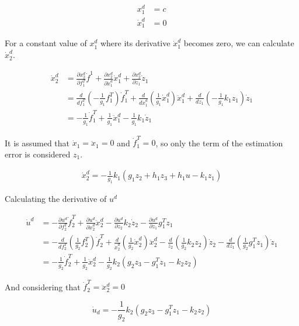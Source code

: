 \begin{align}
    x_1^d &= c \\ \nonumber
    \dot x_1^d &= 0 \nonumber
\end{align}

For a constant value of  $x_1^d$ where its derivative $\dot x_1^d$ becomes zero, we can calculate $\dot x_2^d$. 

\begin{align}
    \dot x_2^d &= \frac{\partial x_2^d}{\partial f_1^T} \dot f^1 + \frac{ \partial x_2^d}{\partial \ddot x_1^d} \dot x_1^d + \frac{\partial x_2^d}{\partial z_1} \dot z_1 \nonumber \\
    &= \frac{d}{d f_1^T} (-\frac{1}{g_1} f_1^T) \dot f_1^T + \frac{d}{d \dot x_1^d} ( \frac{1}{g_1} \dot x_1^d) \ddot x_1^d + \frac{d}{d z_1} (-\frac{1}{g_1} k_1 z_1) \dot z_1 \nonumber \\
    &= -\frac{1}{g_1} \dot f_1^T + \frac{1}{g_1} \ddot x_1^d - \frac{1}{g_1} k_1 \dot z_1
\end{align}

It is assumed that $\dot x_1 = \ddot x_1 = 0$ and $\dot f_1^T = 0$, so only the term of the estimation error is considered $z_1$.

\begin{gather}
\label{derivada control 1}
    \dot x_2^d = -\frac{1}{g_1} k_1 (g_1 z_2 + h_1 z_3 + h_1 u - k_1 z_1) 
\end{gather}

Calculating the derivative of $u^d$

\begin{align}
    \dot u^d &= - \frac{\partial u^d}{\partial{f_2^T}}  \dot f_2^T + \frac{\partial u^d}{\partial{\dot x_2^d}} \ddot x_2^d - \frac{\partial u^d}{\partial{z_2}} k_2 \dot z_2 - \frac{\partial u^d}{\partial{z_1}} g_1^T z_1 \nonumber \\
    &= - \frac{d}{df_2^T}(\frac{1}{g_2}f_2^T) \dot f_2^T + \frac{d}{\dot x_2^d} (\frac{1}{g_2}\dot x_2^d) \ddot x_2^d - \frac{d}{ z_2}(\frac{1}{g_2}k_2 z_2) \dot z_2 - \frac{d}{d z_1}  (\frac{1}{g_2} g_1^T z_1) \dot z_1 \nonumber \\
    &= -\frac{1}{g_2} \dot f_2^T + \frac{1}{g_2} \ddot x_2^d - \frac{1}{g_2} k_2 (g_2 z_3 - g_1^T z_1 - k_2 z_2) 
\end{align}

And considering that $\dot f_2^T=\ddot x_2^d=0$ 

\begin{equation}
\label{derivada control 2}
    \dot u_d = - \frac{1}{g_2} k_2 (g_2 z_3 - g_1^T z_1 - k_2 z_2)
\end{equation}


